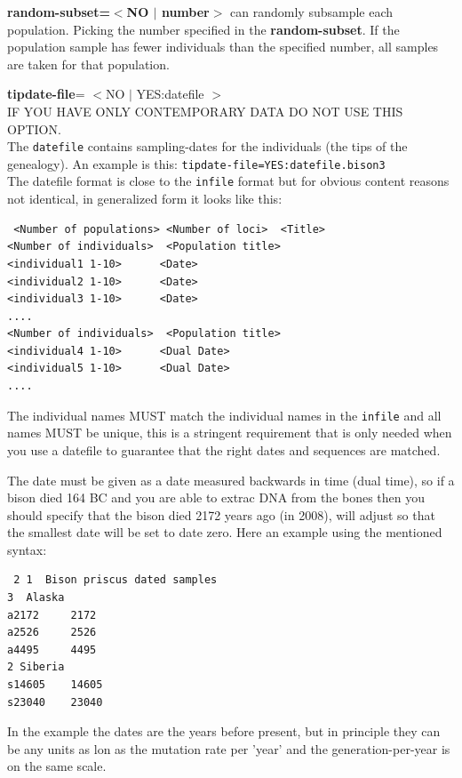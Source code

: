 \begin{description}
\item {\bf random-subset=$<$NO $|$ number$>$}
\migrate can randomly subsample each population. Picking the number specified in the {\bf random-subset}. If the population sample has fewer individuals than the specified number, all samples are taken for that population.


\item{\bf tipdate-file}= $<$NO $|$ YES:datefile $>$ \\
IF YOU HAVE ONLY CONTEMPORARY DATA DO NOT USE THIS OPTION.\\
The {\tt datefile} contains sampling-dates for the individuals (the tips of the genealogy). An example is this: 
{\tt tipdate-file=YES:datefile.bison3}\\
The datefile format is close to the {\tt infile} format but for obvious content reasons not identical, in generalized form it looks like this:
 \begin{small}
 \begin{verbatim}
 <Number of populations> <Number of loci>  <Title>
<Number of individuals>  <Population title>
<individual1 1-10>      <Date>  
<individual2 1-10>      <Date>  
<individual3 1-10>      <Date>  
....
<Number of individuals>  <Population title>
<individual4 1-10>      <Dual Date>  
<individual5 1-10>      <Dual Date>  
....
\end{verbatim}
\end{small}
The individual names MUST match the individual names in the {\tt infile} and all names MUST be unique, this is a stringent requirement that is only needed when you use a datefile to guarantee that the right dates and sequences are matched. 

The date must be given as a date measured backwards in time (dual time), so if a bison died 164 BC and you are able to extrac DNA from the bones then you should specify that the bison died 2172 years ago (in 2008), \migrate will adjust so that the smallest date will be set to date zero. Here an example using the mentioned syntax:
 \begin{small}
 \begin{verbatim}
 2 1  Bison priscus dated samples
3  Alaska
a2172     2172  
a2526     2526  
a4495     4495  
2 Siberia
s14605    14605
s23040    23040
\end{verbatim}
\end{small}
In the example the dates are the years before present, but in principle they can be any units as lon as the mutation rate per 'year' and the generation-per-year is on the same scale.


\end{description}
